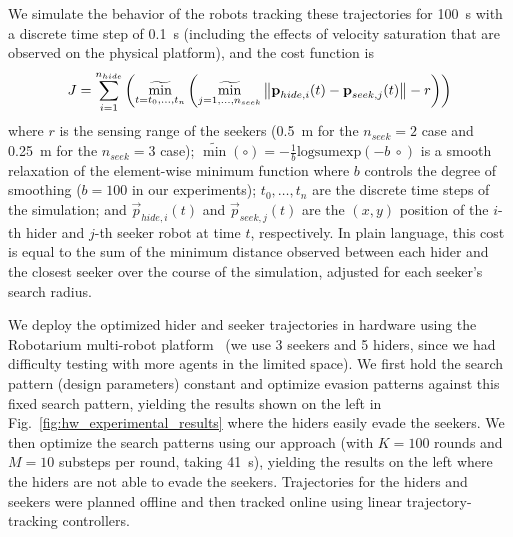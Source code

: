 We simulate the behavior of the robots tracking these trajectories for \SI{100}{s} with a discrete time step of \SI{0.1}{s} (including the effects of velocity saturation that are observed on the physical platform), and the cost function is
\begin{align*}
    J = \sum_{i=1}^{n_{hide}}\left( \mathop{\widetilde{\min}}_{t = t_0, \ldots, t_{n}} \left( \mathop{\widetilde{\min}}_{j=1, \ldots, n_{seek}}\left\lVert\boldsymbol{\mathbf{p}}_{hide, i}(t) - \boldsymbol{\mathbf{p}}_{seek, j}(t)\right\rVert - r \right) \right)
\end{align*}
%
where $r$ is the sensing range of the seekers (\SI{0.5}{m} for the $n_{seek} = 2$ case and \SI{0.25}{m} for the $n_{seek}=3$ case); $\widetilde{\min}(\circ) = -\frac{1}{b}\text{logsumexp}(-b\ \circ)$ is a smooth relaxation of the element-wise minimum function where $b$ controls the degree of smoothing ($b=100$ in our experiments); $t_0, \ldots, t_{n}$ are the discrete time steps of the simulation; and $\vec{p}_{hide, i}(t)$ and $\vec{p}_{seek, j}(t)$ are the $(x, y)$ position of the $i$-th hider and $j$-th seeker robot at time $t$, respectively. In plain language, this cost is equal to the sum of the minimum distance observed between each hider and the closest seeker over the course of the simulation, adjusted for each seeker's search radius.

We deploy the optimized hider and seeker trajectories in hardware using the Robotarium multi-robot platform~\cite{wilsonRobotariumGloballyImpactful2020} (we use 3 seekers and 5 hiders, since we had difficulty testing with more agents in the limited space). We first hold the search pattern (design parameters) constant and optimize evasion patterns against this fixed search pattern, yielding the results shown on the left in Fig.~\ref{fig:hw_experimental_results} where the hiders easily evade the seekers. We then optimize the search patterns using our approach (with $K=100$ rounds and $M=10$ substeps per round, taking \SI{41}{s}), yielding the results on the left where the hiders are not able to evade the seekers. Trajectories for the hiders and seekers were planned offline and then tracked online using linear trajectory-tracking controllers.

